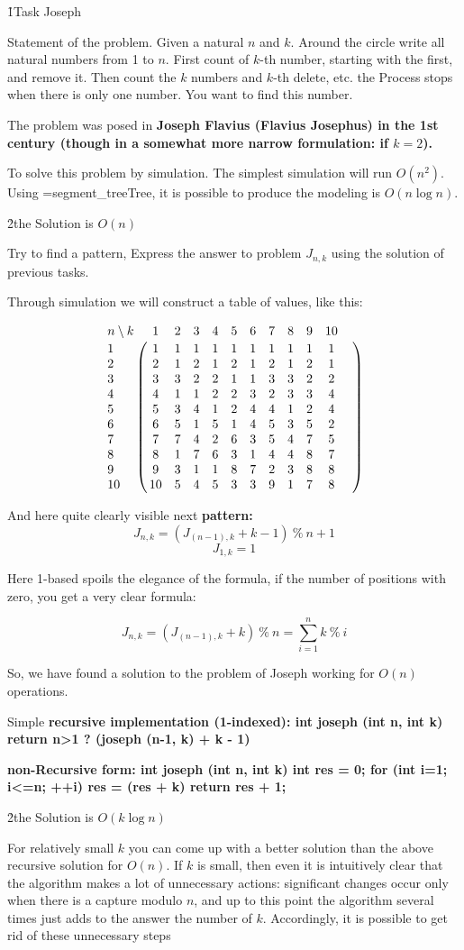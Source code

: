 \h1{Task Joseph}

Statement of the problem. Given a natural $n$ and $k$. Around the circle write all natural numbers from 1 to $n$. First count of $k$-th number, starting with the first, and remove it. Then count the $k$ numbers and $k$-th delete, etc. the Process stops when there is only one number. You want to find this number.

The problem was posed in \bf{Joseph Flavius} (Flavius Josephus) in the 1st century (though in a somewhat more narrow formulation: if $k = 2$).

To solve this problem by simulation. The simplest simulation will run $O (n^2)$. Using \algohref=segment_tree{Tree}, it is possible to produce the modeling is $O (n \log n)$.

\h2{the Solution is $O(n)$}

Try to find a pattern, Express the answer to problem $J_{n,k}$ using the solution of previous tasks.

Through simulation we will construct a table of values, like this:

$$ \bordermatrix {
n \setminus k&1&2&3&4&5&6&7&8&9&10 \cr
1&1&1&1&1&1&1&1&1&1&1& \cr
2&2&1&2&1&2&1&2&1&2&1& \cr
3&3&3&2&2&1&1&3&3&2&2& \cr
4&4&1&1&2&2&3&2&3&3&4& \cr
5&5&3&4&1&2&4&4&1&2&4& \cr
6&6&5&1&5&1&4&5&3&5&2& \cr
7&7&7&4&2&6&3&5&4&7&5& \cr
8&8&1&7&6&3&1&4&4&8&7& \cr
9&9&3&1&1&8&7&2&3&8&8& \cr
10&10&5&4&5&3&3&9&1&7&8& \cr
} $$

And here quite clearly visible next \bf{pattern}:
$$ J_{n,k} = \left( J_{(n-1),k} + k - 1 \right)\ \%\ n + 1 $$
$$ J_{1,k} = 1 $$

Here 1-based spoils the elegance of the formula, if the number of positions with zero, you get a very clear formula:

$$ J_{n,k} = \left( J_{(n-1),k} + k \right)\ \%\ n = \sum_{i=1}^n k\ \%\ i $$

So, we have found a solution to the problem of Joseph working for $O (n)$ operations.

Simple \bf{recursive implementation} (1-indexed):
\code
int joseph (int n, int k) {
return n>1 ? (joseph (n-1, k) + k - 1) %
}
\endcode

\bf{non-Recursive form}:
\code
int joseph (int n, int k) {
int res = 0;
for (int i=1; i<=n; ++i)
res = (res + k) %
return res + 1;
}
\endcode

\h2{the Solution is $O(k \log n)$}

For relatively small $k$ you can come up with a better solution than the above recursive solution for $O(n)$. If $k$ is small, then even it is intuitively clear that the algorithm makes a lot of unnecessary actions: significant changes occur only when there is a capture modulo $n$, and up to this point the algorithm several times just adds to the answer the number of $k$. Accordingly, it is possible to get rid of these unnecessary steps 

